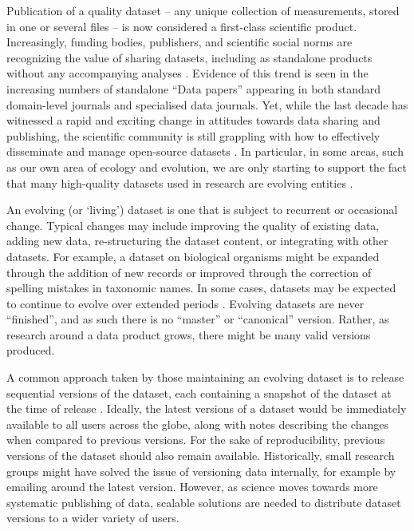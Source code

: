 \documentclass[a4paper,num-refs]{assets/oup-contemporary}
\begin{document}
Publication of a quality dataset -- any unique collection of measurements, stored in one or several files -- is now considered a first-class scientific product. Increasingly, funding bodies, publishers, and scientific social norms are recognizing the value of sharing datasets, including as standalone products without any accompanying analyses \cite{Whitlock-2011,Fairbairn-2011,Piwowar-2011,VanNoorden-2013,Gibney-2013}. Evidence of this trend is seen in the increasing numbers of standalone ``Data papers'' appearing in both standard domain-level journals and specialised data journals. Yet, while the last decade has witnessed a rapid and exciting change in attitudes towards data sharing and publishing, the scientific community is still grappling with how to effectively disseminate and manage open-source datasets \cite{Whitlock-2011, Goodman-2014, Force11-2014, Lowndes-2017, Perkel-2016, VanNoorden-2013, Kratz-2015,Wilkinson-2016, Yenni-2018}. In particular, in some areas, such as our own area of ecology and evolution, we are only starting to support the fact that many high-quality datasets used in research are evolving entities \cite{Yenni-2018}.

An evolving (or `living') dataset is one that is subject to recurrent or occasional change.  Typical changes may include improving the quality of existing data, adding new data, re-structuring the dataset content, or integrating with other datasets. For example, a dataset on biological organisms might be expanded through the addition of new records or improved through the correction of spelling mistakes in taxonomic names. In some cases, datasets may be expected to continue to evolve over extended periods \cite[e.g.][]{Ernest-2018}. Evolving datasets are never ``finished'', and as such there is no ``master'' or ``canonical'' version. Rather, as research around a data product grows, there might be many valid versions produced.  %

A common approach taken by those maintaining an evolving dataset is to release sequential versions of the dataset, each containing a snapshot of the dataset at the time of release \cite[e.g.][]{Falster-2015, Pennell-2015a, Yenni-2018, Abolfathi-2018}. Ideally, the latest versions of a dataset would be immediately available to all users across the globe, along with notes describing the changes when compared to previous versions. For the sake of reproducibility, previous versions of the dataset should also remain available. Historically, small research groups might have solved the issue of versioning data internally, for example by emailing around the latest version. However, as science moves towards more systematic publishing of data, scalable solutions are needed to distribute dataset versions to a wider variety of users.
\end{document}
